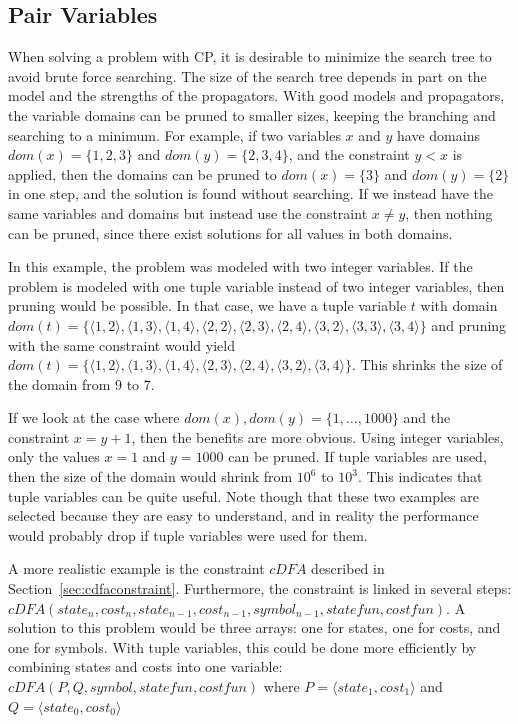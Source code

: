 \documentclass[a4paper,11pt]{article}
\begin{document}
\subsection{Pair Variables}
When solving a problem with CP, it is desirable to minimize the search tree to avoid brute force searching. The size of the search tree depends in part on the model and the strengths of the propagators. With good models and propagators, the variable domains can be pruned to smaller sizes, keeping the branching and searching to a minimum. For example, if two variables $x$ and $y$ have domains $dom(x)=\{1,2,3\}$ and $dom(y)=\{2,3,4\}$, and the constraint $y<x$ is applied, then the domains can be pruned to $dom(x)=\{3\}$ and $dom(y)=\{2\}$ in one step, and the solution is found without searching. If we instead have the same variables and domains but instead use the constraint $x\neq y$, then nothing can be pruned, since there exist solutions for all values in both domains.

In this example, the problem was modeled with two integer variables. If the problem is modeled with one tuple variable instead of two integer variables, then pruning would be possible. In that case, we have a tuple variable $t$ with domain 
$dom(t)=\{
\langle1,2\rangle,\allowbreak 
\langle1,3\rangle,\allowbreak 
\langle1,4\rangle,\allowbreak
\langle2,2\rangle,\allowbreak
\langle2,3\rangle,\allowbreak
\langle2,4\rangle,\allowbreak
\langle3,2\rangle,\allowbreak
\langle3,3\rangle,\allowbreak
\langle3,4\rangle\}$ 
and pruning with the same constraint would yield 
$dom(t)=\{
\langle1,2\rangle,\allowbreak
\langle1,3\rangle,\allowbreak
\langle1,4\rangle,\allowbreak
\langle2,3\rangle,\allowbreak
\langle2,4\rangle,\allowbreak
\langle3,2\rangle,\allowbreak
\langle3,4\rangle\}$. 
This shrinks the size of the domain from 9 to 7. 

If we look at the case where $dom(x),dom(y)=\{1,\ldots,1000\}$ and the constraint $x=y+1$, then the benefits are more obvious. Using integer variables, only the values $x=1$ and $y=1000$ can be pruned. If tuple variables are used, then the size of the domain would shrink from $10^6$ to $10^3$. This indicates that tuple variables can be quite useful. Note though that these two examples are selected because they are easy to understand, and in reality the performance would probably drop if tuple variables were used for them. 

A more realistic example is the constraint $cDFA$ described in Section~\ref{sec:cdfaconstraint}. Furthermore, the constraint is linked in several steps: 
$cDFA(state_n, \allowbreak
cost_n,\allowbreak
state_{n-1},\allowbreak
cost_{n-1},\allowbreak
symbol_{n-1},\allowbreak
statefun, \allowbreak
costfun)$. A solution to this problem would be three arrays: one for states, one for costs, and one for symbols. With tuple variables, this could be done more efficiently by combining states and costs into one variable: 
$cDFA(P, \allowbreak
Q, \allowbreak
symbol, \allowbreak
statefun, \allowbreak
costfun)$ where $P=\langle state_1, cost_1\rangle$ and $Q=\langle state_0, cost_0\rangle$
\end{document}
